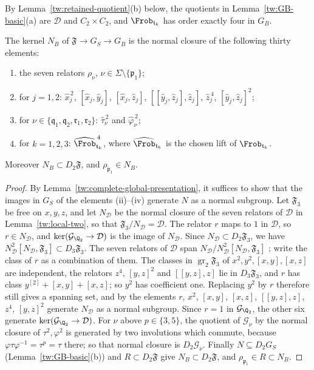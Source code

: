 By Lemma~\ref{tw:retained-quotient}(b) below, the quotients in
Lemma~\ref{tw:GB-basic}(a) are $\mathcal D$ and $C_2\times C_2$, and
$\Frob_{\mathfrak t_k}$ has order exactly four in $G_B$.

\begin{lemma}\label{tw:GB-presentation}
The kernel $N_B$ of $\mathfrak F\to G_S\to G_B$ is the normal closure
of the following thirty elements:
\begin{enumerate}
\item[(i)] the seven relators $\rho_\nu$, $\nu\in\Sigma\setminus\{\mathfrak p_1\}$;
\item[(ii)] for $j=1,2$: $\hat x_j^{\,2}$, $[\hat x_j,\hat y_j]$,
 $[\hat x_j,\hat z_j]$, $[[\hat y_j,\hat z_j],\hat z_j]$, $\hat z_j^{\,4}$,
 $[\hat y_j,\hat z_j]^2$;
\item[(iii)] for $\nu\in\{\mathfrak q_1,\mathfrak q_2,\mathfrak r_1,\mathfrak r_2\}$:
 $\hat\tau_\nu^{\,2}$ and $\hat\varphi_\nu^{\,2}$;
\item[(iv)] for $k=1,2,3$: $\widehat{\Frob}_{\mathfrak t_k}^{\,4}$, where $\widehat{\Frob}_{\mathfrak t_k}$ is the chosen
 lift of $\Frob_{\mathfrak t_k}$.
\end{enumerate}
Moreover $N_B\subset D_2\mathfrak F$, and $\rho_{\mathfrak p_1}\in N_B$.
\end{lemma}

\begin{proof}
By Lemma~\ref{tw:complete-global-presentation}, it suffices to show that the
images in $G_S$ of the elements (ii)--(iv) generate $N$ as a normal
subgroup. Let $\mathfrak F_3$ be free on $x,y,z$, and let $N_{\mathcal D}$ be the normal
closure of the seven relators of $\mathcal D$ in Lemma~\ref{tw:local-two}, so that
$\mathfrak F_3/N_{\mathcal D}=\mathcal D$. The relator $r$ maps to $1$ in $\mathcal D$, so $r\in N_{\mathcal D}$, and
$\ker(\mathcal G_{\Q_2}\to \mathcal D)$ is the image of $N_{\mathcal D}$. Since
$N_{\mathcal D}\subset D_2\mathfrak F_3$, we have
$N_{\mathcal D}^2[N_{\mathcal D},\mathfrak F_3]\subset D_3\mathfrak F_3$. The seven relators of $\mathcal D$
span $N_{\mathcal D}/N_{\mathcal D}^2[N_{\mathcal D},\mathfrak F_3]$
\cite[Corollary~3.9.3]{NeukirchSchmidtWingberg2008}; write the class of $r$ as
a combination of them. The classes in $\operatorname{gr}_2\mathfrak F_3$ of
$x^2,y^2,[x,y],[x,z]$ are independent, the relators $z^4$, $[y,z]^2$ and
$[[y,z],z]$ lie in $D_3\mathfrak F_3$, and $r$ has class
$y^{[2]}+[x,y]+[x,z]$; so $y^2$ has coefficient one. Replacing $y^2$ by $r$
therefore still gives a spanning set, and by
\cite[Corollary~3.9.3]{NeukirchSchmidtWingberg2008} the elements $r$, $x^2$,
$[x,y]$, $[x,z]$, $[[y,z],z]$, $z^4$, $[y,z]^2$ generate $N_{\mathcal D}$ as a normal
subgroup. Since $r=1$ in $\mathcal G_{\Q_2}$, the other six generate
$\ker(\mathcal G_{\Q_2}\to \mathcal D)$. For $\nu$ above $p\in\{3,5\}$, the quotient
of $\mathcal G_\nu$ by the normal closure of $\tau^2,\varphi^2$ is generated
by two involutions which commute, because
$\varphi\tau\varphi^{-1}=\tau^p=\tau$ there; so that normal closure is
$D_2\mathcal G_\nu$. Finally $N\subseteq D_2G_S$
(Lemma~\ref{tw:GB-basic}(b)) and
$R\subset D_2\mathfrak F$ give $N_B\subset D_2\mathfrak F$, and
$\rho_{\mathfrak p_1}\in R\subset N_B$.
\end{proof}

